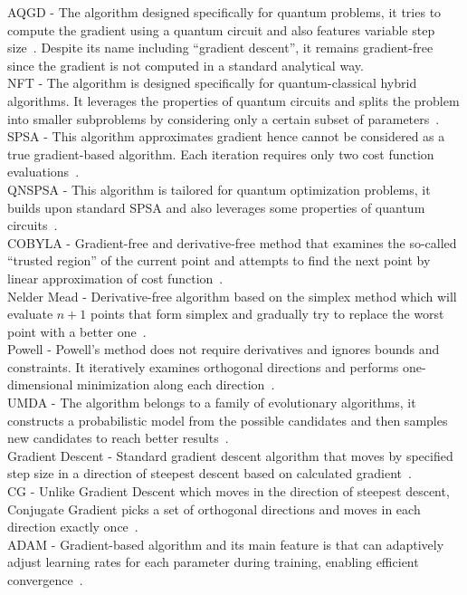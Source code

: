 \noindent AQGD - The algorithm designed specifically for quantum problems, it tries to compute the gradient using a quantum circuit and also features variable step size~\cite{aqgd}. Despite its name including ``gradient descent'', it remains gradient-free since the gradient is not computed in a standard analytical way.\\
NFT - The algorithm is designed specifically for quantum-classical hybrid algorithms. It leverages the properties of quantum circuits and splits the problem into smaller subproblems by considering only a certain subset of parameters~\cite{nft}.\\
SPSA - This algorithm approximates gradient hence cannot be considered as a true gradient-based algorithm. Each iteration requires only two cost function evaluations~\cite{spsa}.\\
QNSPSA - This algorithm is tailored for quantum optimization problems, it builds upon standard SPSA and also leverages some properties of quantum circuits~\cite{qnspsa}.\\
COBYLA - Gradient-free and derivative-free method that examines the so-called ``trusted region'' of the current point and attempts to find the next point by linear approximation of cost function~\cite{cobyla}.\\
Nelder Mead - Derivative-free algorithm based on the simplex method which will evaluate $n+1$ points that form simplex and gradually try to replace the worst point with a better one~\cite{nelder_mead}.\\
Powell - Powell's method does not require derivatives and ignores bounds and constraints. It iteratively examines orthogonal directions and performs one-dimensional minimization along each direction~\cite{powell}.\\
UMDA - The algorithm belongs to a family of evolutionary algorithms, it constructs a probabilistic model from the possible candidates and then samples new candidates to reach better results~\cite{umda}.\\
Gradient Descent - Standard gradient descent algorithm that moves by specified step size in a direction of steepest descent based on calculated gradient~\cite{gd}.\\
CG - Unlike Gradient Descent which moves in the direction of steepest descent, Conjugate Gradient picks a set of orthogonal directions and moves in each direction exactly once~\cite{cg}.\\ 
ADAM - Gradient-based algorithm and its main feature is that can adaptively adjust learning rates for each parameter during training, enabling efficient convergence~\cite{adam}.\\

